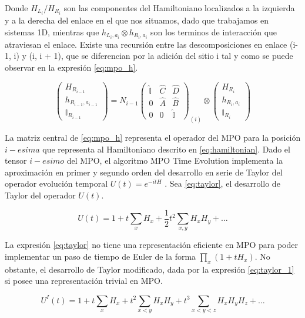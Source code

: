 Donde $H_{L_i}/H_{R_i}$
son las componentes del Hamiltoniano localizados a la izquierda y a la derecha del enlace en el que nos situamos, dado que trabajamos en sistemas 1D, mientras que $h_{L_i, a_i} \otimes h_{R_i, a_i}$ son los terminos de interacción que atraviesan el enlace. Existe una recursión entre las descomposiciones en enlace (i-1, i) y (i, i + 1), que se diferencian por la adición del sitio i tal y como se puede observar en la expresión \ref{eq:mpo_h}.

\begin{equation}
  \begin{pmatrix}
H_{R_{i-1}} \\
h_{R_{i-1}, a_{i-1}} \\
\mathbb{I}_{R_{i-1}}
\end{pmatrix}
=
N_{i-1}
\begin{pmatrix}
\hat{\mathbb{I}} & \hat{C} & \hat{D} \\
0 & \hat{A} & \hat{B} \\
0 & 0 & \hat{\mathbb{I}}
\end{pmatrix}_{(i)}
\otimes
\begin{pmatrix}
H_{R_i} \\
h_{R_i, a_i} \\
\mathbb{I}_{R_i}
\end{pmatrix}
\label{eq:mpo_h}
\end{equation}

La matriz central de \ref{eq:mpo_h} representa el operador del MPO para la posición $i-esima$ que representa al Hamiltoniano descrito en \ref{eq:hamiltonian}. Dado el tensor $i-esimo$ del MPO, el algoritmo MPO Time Evolution implementa la aproximación en primer y segundo orden del desarrollo en serie de Taylor del operador evolución temporal $U(t) = e^{-it H}$ . Sea \ref{eq:taylor}, el desarrollo de Taylor del operador $U(t)$.


\begin{equation}
U(t) = 1 + t \sum_{x} H_x + \frac{1}{2} t^2 \sum_{x,y} H_x H_y + \ldots
\label{eq:taylor}
\end{equation}

La expresión \ref{eq:taylor} no tiene una representación eficiente en MPO para poder implementar un paso de tiempo de Euler de la forma $\prod_{x}(1 + t H_{x})$. No obstante, el desarrollo de Taylor modificado, dada por la expresión \ref{eq:taylor_1} si posee una representación trivial en MPO.

\begin{equation}
U^I(t) = 1 + t \sum_{x} H_x + t^2 \sum_{x<y} H_x H_y + t^3 \sum_{x<y<z} H_x H_y H_z + \ldots
\label{eq:taylor_1}
\end{equation}


